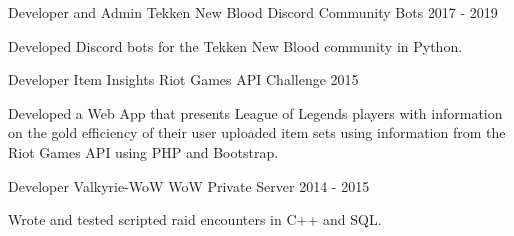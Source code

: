 

\begin{cventries}

  \cventry
    {Developer and Admin} %
    {Tekken New Blood} %
    {Discord Community Bots} %
    {2017 - 2019} %
    {
      \begin{cvitems} %
        \item {Developed Discord bots for the Tekken New Blood community in Python.}
      \end{cvitems}
    }
  \cventry
    {Developer} %
    {Item Insights} %
    {Riot Games API Challenge} %
    {2015} %
    {
      \begin{cvitems} %
        \item {Developed a Web App that presents League of Legends players with information on the gold efficiency of their user uploaded item sets using information from the Riot Games API using PHP and Bootstrap.}
      \end{cvitems}
    }

  \cventry
    {Developer} %
    {Valkyrie-WoW} %
    {WoW Private Server} %
    {2014 - 2015} %
    {
      \begin{cvitems} %
        \item {Wrote and tested scripted raid encounters in C++ and SQL.}
      \end{cvitems}
    }

\end{cventries}
